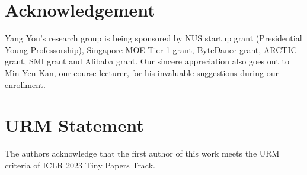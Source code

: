 \documentclass{article} %
\begin{document}
\section*{Acknowledgement}
Yang You's research group is being sponsored by NUS startup grant (Presidential Young Professorship), Singapore MOE Tier-1 grant, ByteDance grant, ARCTIC grant, SMI grant and Alibaba grant. Our sincere appreciation also goes out to Min-Yen Kan, our course lecturer, for his invaluable suggestions during our enrollment.



\section*{URM Statement}
The authors acknowledge that the first author of this work meets the URM criteria of ICLR 2023 Tiny Papers Track.




% 
\end{document}
